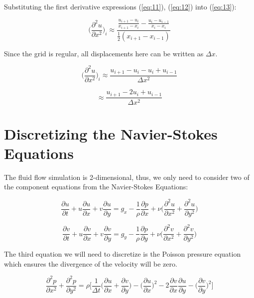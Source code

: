 \documentclass[twocolumn,12pth]{article}
\begin{document}
Substituting the first derivative expressions (\ref{eq:11}), (\ref{eq:12}) into (\ref{eq:13}):

\begin{equation}
\bigg(\frac{\partial^2{u}}{\partial{x^2}}\bigg)_{i} \approx \frac{\frac{u_{i+1} - u_i}{x_{i+1} - x_i} - \frac{u_{i} - u_{i-1}}{x_{i} - x_{i}}}{\frac{1}{2}(x_{i+1} - x_{i-1})}
\end{equation}

Since the grid is regular, all displacements here can be written as $\Delta{x}$.

\begin{equation*}
\bigg(\frac{\partial^2{u}}{\partial{x^2}}\bigg)_{i} \approx \frac{u_{i+1} - u_i - u_i + u_{i-1}}{\Delta{x^2}}
\end{equation*}

\begin{equation*}
\approx \frac{u_{i+1} - 2u_i + u_{i-1}}{\Delta{x^2}}
\end{equation*}

\section{Discretizing the Navier-Stokes Equations}

The fluid flow simulation is 2-dimensional, thus, we only need to consider two of the component equations from the Navier-Stokes Equations:

\begin{equation}
\frac{\partial{u}}{\partial{t}} + u\frac{\partial{u}}{\partial{x}} + v\frac{\partial{u}}{\partial{y}} = g_x - \frac{1}{\rho}\frac{\partial{p}}{\partial{x}} + \nu \bigg( \frac{\partial^2u}{\partial{x}^2} + \frac{\partial^2u}{\partial{y}^2} \bigg)
\label{eq:exs1}
\end{equation}

\begin{equation*}
\frac{\partial{v}}{\partial{t}} + u\frac{\partial{v}}{\partial{x}} + v\frac{\partial{v}}{\partial{y}} = g_y -\frac{1}{\rho}\frac{\partial{p}}{\partial{y}} + \nu \bigg( \frac{\partial^2v}{\partial{x}^2} + \frac{\partial^2v}{\partial{y}^2} \bigg)
\end{equation*}

The third equation we will need to discretize is the Poisson pressure equation which ensures the divergence of the velocity will be zero.

\begin{equation}
\frac{\partial^2p}{\partial{x}^2} + \frac{\partial^2p}{\partial{y}^2} = \rho \bigg[ \frac{1}{\Delta{t}}\bigg(\frac{\partial{u}}{\partial{x}} + \frac{\partial{v}}{\partial{y}} \bigg) - \bigg(\frac{\partial{u}}{\partial{x}} \bigg)^2 - 2\frac{\partial{v}}{\partial{x}}\frac{\partial{u}}{\partial{y}} - \bigg(\frac{\partial{v}}{\partial{y}}  \bigg)^2  \bigg]
\label{eq:exs2}
\end{equation}
\end{document}
